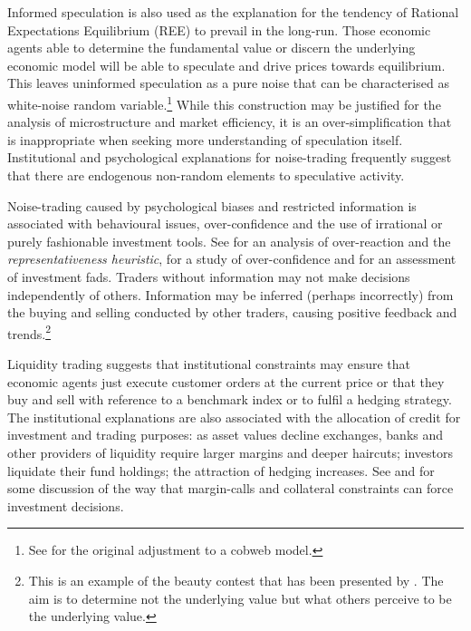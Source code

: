 \documentclass[preprint,12pt,authoryear]{elsarticle}
\begin{document}
Informed speculation is also used as the explanation for the tendency of Rational Expectations Equilibrium (REE) to prevail in the long-run.  Those economic agents able to determine the fundamental value or discern the underlying economic model will be able to speculate and drive prices towards equilibrium.   This leaves uninformed speculation as a pure noise that can be characterised as white-noise random variable.\footnote{See \citet{muth1961Rational} for the original adjustment to a cobweb model.} While this construction may be justified for the analysis of microstructure and market efficiency, it is an over-simplification that is inappropriate when seeking more understanding of speculation itself.  Institutional and psychological explanations for noise-trading frequently suggest that there are endogenous non-random elements to speculative activity.

Noise-trading caused by psychological biases and restricted information is associated with behavioural issues, over-confidence and the use of irrational or purely fashionable investment tools. See \citet{DeBondtOver} for an analysis of over-reaction and the \emph{representativeness heuristic}, \citet{OdeanOC} for a study of over-confidence and  \citet{ShillerFashion} for an assessment of investment fads.  Traders without information may not make decisions independently of others. Information may be inferred (perhaps incorrectly) from the buying and selling conducted by other traders, causing positive feedback and trends.\footnote{This is an example of the beauty contest that has been presented by \citet[p.101]{Keynes1936}. The aim is to determine not the underlying value but what others perceive to be the underlying value.} 

Liquidity trading suggests that institutional constraints may ensure that economic agents just execute customer orders at the current price or that they buy and sell with reference to a benchmark index or to fulfil a hedging strategy. The institutional explanations are also associated with the allocation of credit for investment and trading purposes:  as asset values decline exchanges, banks and other providers of liquidity require larger margins and deeper haircuts; investors liquidate their fund holdings; the attraction of hedging increases.  See \citet{BrunnermeierLiquidity} and \citet{Gorton} for some discussion of the way that margin-calls and collateral constraints can force investment decisions.  
\end{document}
